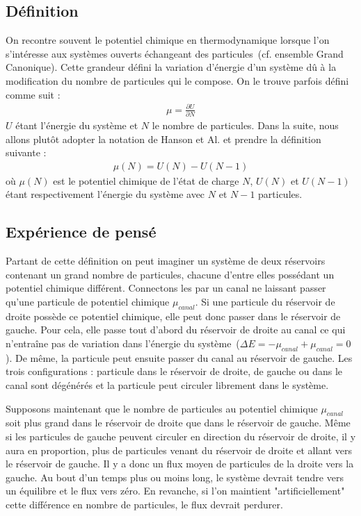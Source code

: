 \subsection{Définition}

On recontre souvent le potentiel chimique en thermodynamique lorsque l'on s'intéresse aux systèmes ouverts échangeant des particules~(cf. ensemble Grand Canonique). Cette grandeur défini la variation d'énergie d'un système d\^u à la modification du nombre de particules qui le compose. On le trouve parfois défini comme suit :
\begin{eqnarray}
\mu = \frac{\partial U}{\partial N} \nonumber
\end{eqnarray}
$U$ étant l'énergie du système et $N$ le nombre de particules. Dans la suite, nous allons plut\^ot adopter la notation de Hanson et Al. et prendre la définition suivante :
\begin{eqnarray}
\mu(N) = U(N) - U(N-1)
\end{eqnarray}
où $\mu(N)$ est le potentiel chimique de l'état de charge $N$, $U(N)$ et $U(N-1)$ étant respectivement l'énergie du système avec $N$ et $N-1$ particules.

\subsection{Expérience de pensé}

Partant de cette définition on peut imaginer un système de deux réservoirs contenant un grand nombre de particules, chacune d'entre elles possédant un potentiel chimique différent. Connectons les par un canal ne laissant passer qu'une particule de potentiel chimique $\mu_{canal}$. Si une particule du réservoir de droite possède ce potentiel chimique, elle peut donc passer dans le réservoir de gauche. Pour cela, elle passe tout d'abord du réservoir de droite au canal ce qui n'entra\^ine pas de variation dans l'énergie du système~($\Delta E = -\mu_{canal} + \mu_{canal} = 0$). De m\^eme, la particule peut ensuite passer du canal au réservoir de gauche. Les trois configurations : particule dans le réservoir de droite, de gauche ou dans le canal sont dégénérés et la particule peut circuler librement dans le système.

Supposons maintenant que le nombre de particules au potentiel chimique $\mu_{canal}$ soit plus grand dans le réservoir de droite que dans le réservoir de gauche. M\^eme si les particules de gauche peuvent circuler en direction du réservoir de droite, il y aura en proportion, plus de particules venant du réservoir de droite et allant vers le réservoir de gauche. Il y a donc un flux moyen de particules de la droite vers la gauche. Au bout d'un temps plus ou moins long, le système devrait tendre vers un équilibre et le flux vers zéro. En revanche, si l'on maintient "artificiellement" cette différence en nombre de particules, le flux devrait perdurer.

